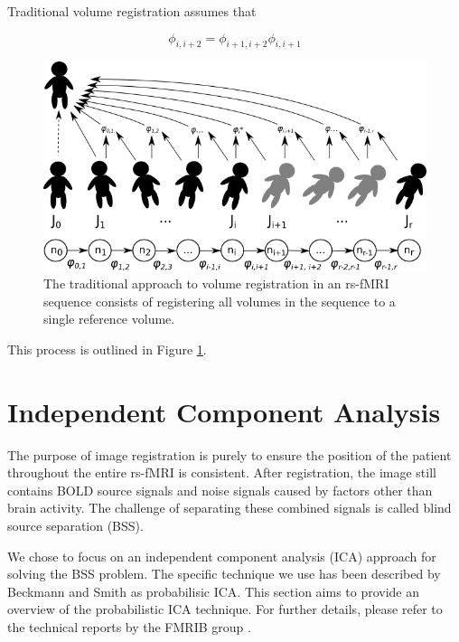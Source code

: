 \noindent Traditional volume registration assumes that 

\begin{equation}
\phi_{i,i+2} = \phi_{i+1,i+2} \phi_{i,i+1}
\end{equation}

\begin{figure}
\centering
\includegraphics[width=.7\textwidth]{4/dag-registration.png}
\caption{The traditional approach to volume registration in an rs-fMRI sequence consists of registering all volumes in the sequence to a single reference volume.}
\label{ch4:fig:dag-reg}
\end{figure}

 This process is outlined in Figure \ref{ch4:fig:dag-reg}.

\section{Independent Component Analysis}

The purpose of image registration is purely to ensure the position of the patient throughout the entire rs-fMRI is consistent. After registration, the image still contains BOLD source signals and noise signals caused by factors other than brain activity. The challenge of separating these combined signals is called blind source separation (BSS). 

We chose to focus on an independent component analysis (ICA) approach for solving the BSS problem. The specific technique we use has been described by Beckmann and Smith as probabilisic ICA. This section aims to provide an overview of the probabilistic ICA technique. For further details, please refer to the technical reports by the FMRIB group \cite{Beckmann2004} \cite{Woolrich2004} \cite{Beckmann} \cite{Smith2004}.

